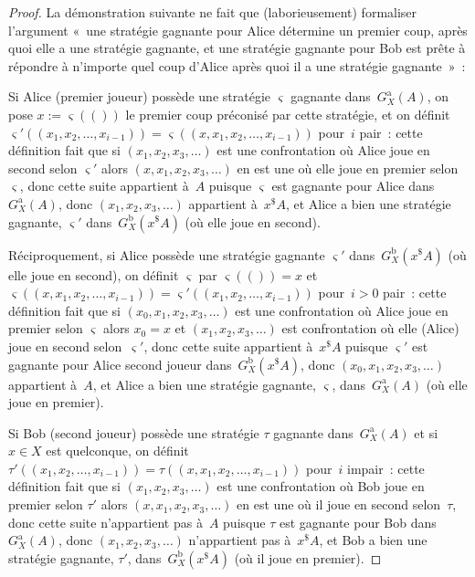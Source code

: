 \documentclass[12pt,a4paper]{article}
\theoremstyle{definition}
\begin{document}
\begin{proof}
La démonstration suivante ne fait que (laborieusement) formaliser
l'argument « une stratégie gagnante pour Alice détermine un premier
coup, après quoi elle a une stratégie gagnante, et une stratégie
gagnante pour Bob est prête à répondre à n'importe quel coup d'Alice
après quoi il a une stratégie gagnante » :

Si Alice (premier joueur) possède une stratégie $\varsigma$ gagnante
dans $G_X^{\mathrm{a}}(A)$, on pose $x := \varsigma(())$ le premier
coup préconisé par cette stratégie, et on définit
$\varsigma'((x_1,x_2,\ldots,x_{i-1})) =
\varsigma((x,x_1,x_2,\ldots,x_{i-1}))$ pour $i$ pair : cette
définition fait que si $(x_1,x_2,x_3,\ldots)$ est une confrontation où
Alice joue en second selon $\varsigma'$ alors $(x,x_1,x_2,x_3,\ldots)$
en est une où elle joue en premier selon $\varsigma$, donc cette suite
appartient à $A$ puisque $\varsigma$ est gagnante pour Alice
dans $G_X^{\mathrm{a}}(A)$, donc $(x_1,x_2,x_3,\ldots)$ appartient
à $x^{\$} A$, et Alice a bien une stratégie gagnante, $\varsigma'$
dans $G_X^{\mathrm{b}}(x^{\$} A)$ (où elle joue en second).

Réciproquement, si Alice possède une stratégie gagnante $\varsigma'$
dans $G_X^{\mathrm{b}}(x^{\$} A)$ (où elle joue en second), on définit
$\varsigma$ par $\varsigma(()) = x$ et
$\varsigma((x,x_1,x_2,\ldots,x_{i-1})) =
\varsigma'((x_1,x_2,\ldots,x_{i-1}))$ pour $i > 0$ pair : cette
définition fait que si $(x_0,x_1,x_2,x_3,\ldots)$ est une
confrontation où Alice joue en premier selon $\varsigma$ alors $x_0 =
x$ et $(x_1,x_2,x_3,\ldots)$ est confrontation où elle (Alice) joue en
second selon $\varsigma'$, donc cette suite appartient à $x^{\$} A$
puisque $\varsigma'$ est gagnante pour Alice second joueur
dans $G_X^{\mathrm{b}}(x^{\$} A)$, donc $(x_0,x_1,x_2,x_3,\ldots)$
appartient à $A$, et Alice a bien une stratégie gagnante, $\varsigma$,
dans $G_X^{\mathrm{a}}(A)$ (où elle joue en premier).

Si Bob (second joueur) possède une stratégie $\tau$ gagnante
dans $G_X^{\mathrm{a}}(A)$ et si $x \in X$ est quelconque, on définit
$\tau'((x_1,x_2,\ldots,x_{i-1})) = \tau((x,x_1,x_2,\ldots,x_{i-1}))$
pour $i$ impair : cette définition fait que si $(x_1,x_2,x_3,\ldots)$
est une confrontation où Bob joue en premier selon $\tau'$ alors
$(x,x_1,x_2,x_3,\ldots)$ en est une où il joue en second selon $\tau$,
donc cette suite n'appartient pas à $A$ puisque $\tau$ est gagnante
pour Bob dans $G_X^{\mathrm{a}}(A)$, donc $(x_1,x_2,x_3,\ldots)$
n'appartient pas à $x^{\$} A$, et Bob a bien une stratégie gagnante,
$\tau'$, dans $G_X^{\mathrm{b}}(x^{\$} A)$ (où il joue en premier).


\end{proof}
\end{document}
